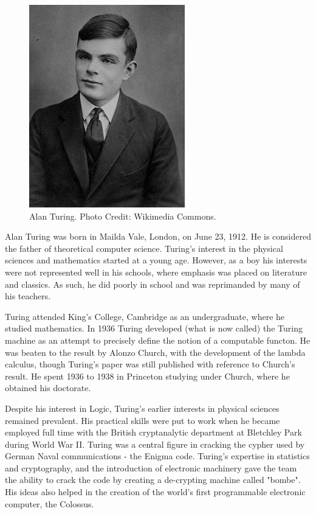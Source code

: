 \documentclass[../../../include/open-logic-section]{subfiles}
\begin{document}
\begin{figure}[h!] 
\centering 
\includegraphics[scale=0.75]{alan-turing.jpg}
\caption{Alan Turing. Photo Credit: Wikimedia Commons.} 
\end{figure}

Alan Turing was born in Mailda Vale, London, on June 23, 1912. He is
considered the father of theoretical computer science. Turing's interest in
the physical sciences and mathematics started at a young age. However, as a
boy his interests were not represented well in his schools, where emphasis
was placed on literature and classics. As such, he did poorly in school and
was reprimanded by many of his teachers.

Turing attended King's College, Cambridge as an undergraduate, where he
studied mathematics. In 1936 Turing developed (what is now called) the
Turing machine as an attempt to precisely define the notion of a computable
functon. He was beaten to the result by Alonzo Church, with the development
of the lambda calculus, though Turing's paper was still published with
reference to Church's result. He spent 1936 to 1938 in Princeton studying
under Church, where he obtained his doctorate.

Despite his interest in Logic, Turing's earlier interests in physical
sciences remained prevalent. His practical skills were put to work when he
became employed full time with the British cryptanalytic department at
Bletchley Park during World War II. Turing was a central figure in cracking
the cypher used by German Naval communications - the Enigma code. 
 Turing's expertise in statistics and cryptography, and the introduction of electronic
machinery gave the team the ability to crack the code by creating a 
de-crypting machine called "bombe". His ideas also helped in the creation
of the world's first programmable electronic computer, the Colossus.
\end{document}
